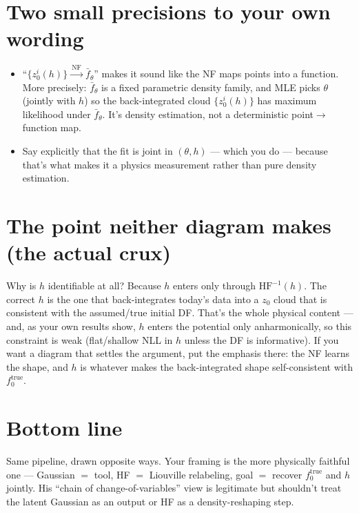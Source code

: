 \documentclass[11pt]{article}
\newcommand{\Ntrue}{f_0^{\text{true}}}
\newcommand{\HF}{\mathrm{HF}}
\begin{document}
\section*{Two small precisions to your own wording}

\begin{itemize}
  \item ``$\{z_0^i(h)\}\xrightarrow{\ \mathrm{NF}\ }\bar f_\theta$'' makes it sound like
  the NF maps points into a function. More precisely: $\bar f_\theta$ is a fixed
  parametric density family, and MLE picks $\theta$ (jointly with $h$) so the
  back-integrated cloud $\{z_0^i(h)\}$ has maximum likelihood under $\bar f_\theta$.
  It's density estimation, not a deterministic point$\to$function map.

  \item Say explicitly that the fit is joint in $(\theta,h)$ --- which you do --- because
  that's what makes it a physics measurement rather than pure density estimation.
\end{itemize}

\section*{The point neither diagram makes (the actual crux)}

Why is $h$ identifiable at all? Because $h$ enters only through $\HF^{-1}(h)$. The
correct $h$ is the one that back-integrates today's data into a $z_0$ cloud that is
consistent with the assumed/true initial DF. That's the whole physical content --- and,
as your own results show, $h$ enters the potential only anharmonically, so this
constraint is weak (flat/shallow NLL in $h$ unless the DF is informative). If you want a
diagram that settles the argument, put the emphasis there: the NF learns the shape, and
$h$ is whatever makes the back-integrated shape self-consistent with $\Ntrue$.

\section*{Bottom line}

Same pipeline, drawn opposite ways. Your framing is the more physically faithful one ---
Gaussian $=$ tool, HF $=$ Liouville relabeling, goal $=$ recover $\Ntrue$ and $h$
jointly. His ``chain of change-of-variables'' view is legitimate but shouldn't treat the
latent Gaussian as an output or HF as a density-reshaping step.
\end{document}
